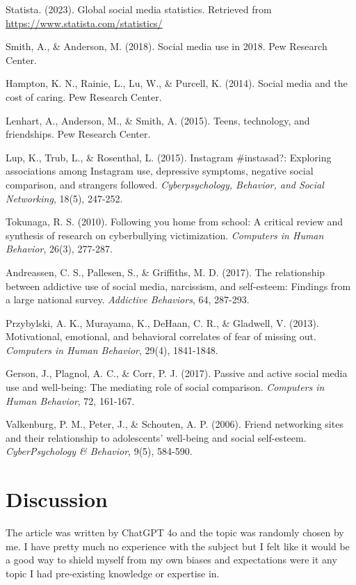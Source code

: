 \documentclass[12pt]{article}
\begin{document}
\begin{thebibliography}{9}

 Statista. (2023). Global social media statistics. Retrieved from \url{https://www.statista.com/statistics/}

 Smith, A., \& Anderson, M. (2018). Social media use in 2018. Pew Research Center.

 Hampton, K. N., Rainie, L., Lu, W., \& Purcell, K. (2014). Social media and the cost of caring. Pew Research Center.

 Lenhart, A., Anderson, M., \& Smith, A. (2015). Teens, technology, and friendships. Pew Research Center.

 Lup, K., Trub, L., \& Rosenthal, L. (2015). Instagram \#instasad?: Exploring associations among Instagram use, depressive symptoms, negative social comparison, and strangers followed. \textit{Cyberpsychology, Behavior, and Social Networking}, 18(5), 247-252.

 Tokunaga, R. S. (2010). Following you home from school: A critical review and synthesis of research on cyberbullying victimization. \textit{Computers in Human Behavior}, 26(3), 277-287.

 Andreassen, C. S., Pallesen, S., \& Griffiths, M. D. (2017). The relationship between addictive use of social media, narcissism, and self-esteem: Findings from a large national survey. \textit{Addictive Behaviors}, 64, 287-293.

 Przybylski, A. K., Murayama, K., DeHaan, C. R., \& Gladwell, V. (2013). Motivational, emotional, and behavioral correlates of fear of missing out. \textit{Computers in Human Behavior}, 29(4), 1841-1848.

 Gerson, J., Plagnol, A. C., \& Corr, P. J. (2017). Passive and active social media use and well-being: The mediating role of social comparison. \textit{Computers in Human Behavior}, 72, 161-167.

 Valkenburg, P. M., Peter, J., \& Schouten, A. P. (2006). Friend networking sites and their relationship to adolescents’ well-being and social self-esteem. \textit{CyberPsychology \& Behavior}, 9(5), 584-590.

\end{thebibliography}

\section{Discussion}
The article was written by ChatGPT 4o and the topic was randomly chosen by me. I have pretty much no experience with the subject but I felt like it would be a good way to shield myself from my own biases and expectations were it any topic I had pre-existing knowledge or expertise in. 
\end{document}
